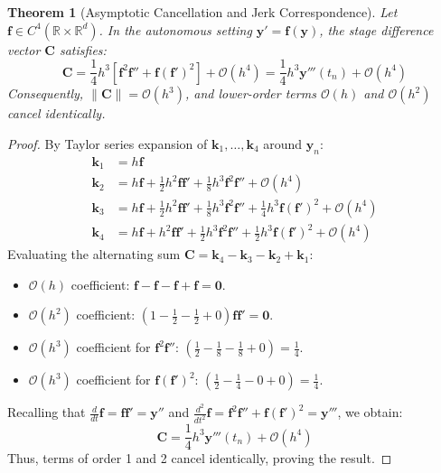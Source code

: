 \documentclass[11pt,a4paper]{article}
\theoremstyle{plain}
\newtheorem{theorem}{Theorem}
\theoremstyle{definition}
\begin{document}
\begin{theorem}[Asymptotic Cancellation and Jerk Correspondence]
Let $\mathbf{f} \in C^4(\mathbb{R} \times \mathbb{R}^d)$. In the autonomous setting $\mathbf{y}' = \mathbf{f}(\mathbf{y})$, the stage difference vector $\mathbf{C}$ satisfies:
\begin{equation}
\mathbf{C} = \frac{1}{4} h^3 \left[ \mathbf{f}^2 \mathbf{f}'' + \mathbf{f}(\mathbf{f}')^2 \right] + \mathcal{O}(h^4) = \frac{1}{4} h^3 \mathbf{y}'''(t_n) + \mathcal{O}(h^4)
\end{equation}
Consequently, $\|\mathbf{C}\| = \mathcal{O}(h^3)$, and lower-order terms $\mathcal{O}(h)$ and $\mathcal{O}(h^2)$ cancel identically.
\end{theorem}
\begin{proof}
By Taylor series expansion of $\mathbf{k}_1, \dots, \mathbf{k}_4$ around $\mathbf{y}_n$:
\begin{align*}
\mathbf{k}_1 &= h \mathbf{f} \\
\mathbf{k}_2 &= h \mathbf{f} + \frac{1}{2}h^2 \mathbf{f}\mathbf{f}' + \frac{1}{8}h^3 \mathbf{f}^2\mathbf{f}'' + \mathcal{O}(h^4) \\
\mathbf{k}_3 &= h \mathbf{f} + \frac{1}{2}h^2 \mathbf{f}\mathbf{f}' + \frac{1}{8}h^3 \mathbf{f}^2\mathbf{f}'' + \frac{1}{4}h^3 \mathbf{f}(\mathbf{f}')^2 + \mathcal{O}(h^4) \\
\mathbf{k}_4 &= h \mathbf{f} + h^2 \mathbf{f}\mathbf{f}' + \frac{1}{2}h^3 \mathbf{f}^2\mathbf{f}'' + \frac{1}{2}h^3 \mathbf{f}(\mathbf{f}')^2 + \mathcal{O}(h^4)
\end{align*}
Evaluating the alternating sum $\mathbf{C} = \mathbf{k}_4 - \mathbf{k}_3 - \mathbf{k}_2 + \mathbf{k}_1$:
\begin{itemize}
    \item $\mathcal{O}(h)$ coefficient: $\mathbf{f} - \mathbf{f} - \mathbf{f} + \mathbf{f} = \mathbf{0}$.
    \item $\mathcal{O}(h^2)$ coefficient: $\left(1 - \frac{1}{2} - \frac{1}{2} + 0\right) \mathbf{f}\mathbf{f}' = \mathbf{0}$.
    \item $\mathcal{O}(h^3)$ coefficient for $\mathbf{f}^2\mathbf{f}''$: $\left(\frac{1}{2} - \frac{1}{8} - \frac{1}{8} + 0\right) = \frac{1}{4}$.
    \item $\mathcal{O}(h^3)$ coefficient for $\mathbf{f}(\mathbf{f}')^2$: $\left(\frac{1}{2} - \frac{1}{4} - 0 + 0\right) = \frac{1}{4}$.
\end{itemize}
Recalling that $\frac{d}{dt}\mathbf{f} = \mathbf{f}\mathbf{f}' = \mathbf{y}''$ and $\frac{d^2}{dt^2}\mathbf{f} = \mathbf{f}^2\mathbf{f}'' + \mathbf{f}(\mathbf{f}')^2 = \mathbf{y}'''$, we obtain:
\begin{equation}
\mathbf{C} = \frac{1}{4} h^3 \mathbf{y}'''(t_n) + \mathcal{O}(h^4)
\end{equation}
Thus, terms of order 1 and 2 cancel identically, proving the result.
\end{proof}
\end{document}
